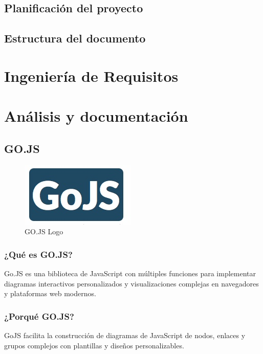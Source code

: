 \documentclass[a4paper,12pt]{article}
\begin{document}
	 	\subsection{Planificación del proyecto}
	 
	 
		\subsection{Estructura del documento}
	 
	  \afterpage{\null\newpage}
	 \newpage
	 
	
	
	\section{Ingeniería de Requisitos}
	
	\afterpage{\null\newpage}
	\newpage
	

	 \section{Análisis y documentación}
	 
	 	\subsection{GO.JS}
	 		
	 		
	 		\begin{figure}[h]
	 			\centering
	 			\includegraphics[scale=1]{gojs.jpeg}
	 			\caption{GO.JS Logo}\label{fig:gojs}
	 		\end{figure}
	 	
	 	
	 		\subsubsection{¿Qué es GO.JS?}
	 			Go.JS \cite{gojs} es una biblioteca de JavaScript con múltiples funciones para implementar diagramas interactivos personalizados y visualizaciones complejas en navegadores y plataformas web modernos.
	 	
	 		\subsubsection{¿Porqué GO.JS?}
	 		 GoJS facilita la construcción de diagramas de JavaScript de nodos, enlaces y grupos complejos con plantillas y diseños personalizables.
	 		
\end{document}
